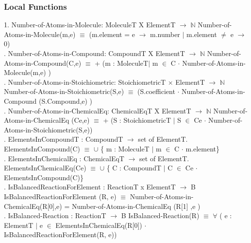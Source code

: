 \documentclass[12pt, titlepage]{article}
\begin{document}
\subsubsection{Local Functions}

1. Number-of-Atoms-in-Molecule: MoleculeT  X ElementT $\rightarrow$ $\mathbb{N}$
\newline
Number-of-Atoms-in-Molecule(m,e) $\equiv$ (m.element = e $\rightarrow$ m.number $\vert$ m.element $\neq$ e $\rightarrow$ 0) \\
. Number-of-Atoms-in-Compound: CompoundT  X ElementT $\rightarrow$ $\mathbb{N}$
\newline
Number-of-Atoms-in-Compound(C,e) $\equiv$ + (m : MoleculeT$\vert$ m $\in$ C $\cdot$   Number-of-Atoms-in-Molecule(m,e) ) \\
. Number-of-Atoms-in-Stoichiometric: StoichiometricT  $\times$ ElementT $\rightarrow$ $\mathbb{N}$
\newline
Number-of-Atoms-in-Stoichiometric(S,e) $\equiv$ (S.coefficient $\cdot$ Number-of-Atoms-in-Compound (S.Compound,e) )  \\
. Number-of-Atoms-in-ChemicalEq: ChemicalEqT  X ElementT $\rightarrow$ $\mathbb{N}$
\newline
Number-of-Atoms-in-ChemicalEq (Ce,e) $\equiv$ + (S : StoichiometricT $\vert$ S $\in$ Ce $\cdot$ Number-of-Atoms-in-Stoichiometric(S,e))\\
. ElementsInCompoundT : CompoundT $\rightarrow$ set of ElementT.
\newline
ElementsInCompound(C) $\equiv$ $\cup$ \{ m : MoleculeT $\vert$ m $\in$ C $\cdot$ m.element\}\\
. ElementsInChemicalEq : ChemicalEqT $\rightarrow$ set of ElementT.
\newline
ElementsInChemicalEq(Ce) $\equiv$ $\cup$ \{ C : CompoundT $\vert$ C $\in$ Ce $\cdot$ ElementsInCompound(C)\}\\
. IsBalancedReactionForElement : ReactionT x ElementT $\rightarrow$ B 
\newline
IsBalancedReactionForElement (R, e) $\equiv$ Number-of-Atoms-in-ChemicalEq(R[0],e) = Number-of-Atoms-in-ChemicalEq (R[1] ,e )\\ 
. IsBalanced-Reaction : ReactionT  $\rightarrow$ B 
\newline
IsBalanced-Reaction(R) $\equiv$ $\forall$ ( e :  ElementT $\vert$ e $\in$ ElementsInChemicalEq(R[0]) $\cdot$ IsBalancedReactionForElement(R, e))
\end{document}
